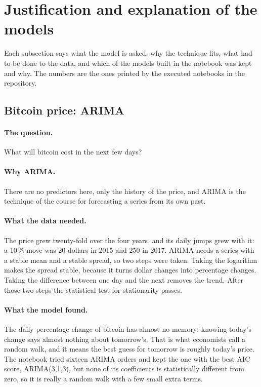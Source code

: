 \section{Justification and explanation of the models}
\label{sec:justification}

Each subsection says what the model is asked, why the technique fits, what
had to be done to the data, and which of the models built in the notebook
was kept and why. The numbers are the ones printed by the executed
notebooks in the repository.

\subsection{Bitcoin price: ARIMA}

\paragraph{The question.} What will bitcoin cost in the next few days?

\paragraph{Why ARIMA.} There are no predictors here, only the history of
the price, and ARIMA is the technique of the course for forecasting a
series from its own past.

\paragraph{What the data needed.} The price grew twenty-fold over the four
years, and its daily jumps grew with it: a 10\,\% move was 20 dollars in 2015
and 250 in 2017. ARIMA needs a series with a stable mean and a stable
spread, so two steps were taken. Taking the logarithm makes the spread
stable, because it turns dollar changes into percentage changes. Taking
the difference between one day and the next removes the trend. After those
two steps the statistical test for stationarity passes.

\paragraph{What the model found.} The daily percentage change of bitcoin
has almost no memory: knowing today's change says almost nothing about
tomorrow's. That is what economists call a random walk, and it means the
best guess for tomorrow is roughly today's price. The notebook tried
sixteen ARIMA orders and kept the one with the best AIC score,
ARIMA(3,1,3), but none of its coefficients is statistically different from
zero, so it is really a random walk with a few small extra terms.

